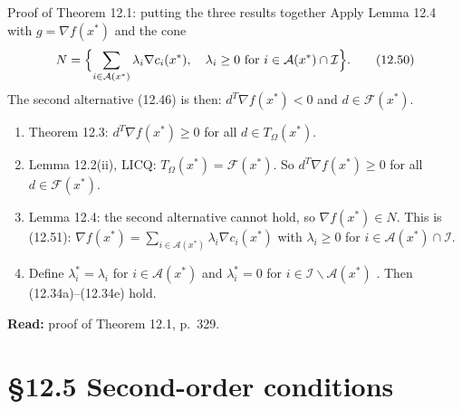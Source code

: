 \documentclass[aspectratio=169,12pt]{beamer}
\newcommand{\xs}{x^{*}}
\newcommand{\gradf}{\nabla f}
\newcommand{\eqn}[1]{\text{\small(#1)}}
\newcommand{\readbook}[1]{{\color{red}\textbf{Read:} #1}}
\newcommand{\ls}{\lambda^{*}}
\newcommand{\cA}{\mathcal{A}}
\newcommand{\cF}{\mathcal{F}}
\newcommand{\cI}{\mathcal{I}}
\newcommand{\TO}{T_{\Omega}}
\begin{document}
\begin{frame}{Proof of Theorem 12.1: putting the three results together}
  Apply Lemma 12.4 with $g=\gradf(\xs)$ and the cone
  \[ N=\Bigl\{\sum_{i\in\cA(\xs)}\lambda_{i}\nabla c_{i}(\xs),\quad
      \lambda_{i}\ge 0\ \text{for } i\in\cA(\xs)\cap\cI\Bigr\} . \tag{12.50} \]
  The second alternative (12.46) is then: $d^{T}\gradf(\xs)<0$ and $d\in\cF(\xs)$.
  \begin{enumerate}\setlength\itemsep{0.1em}
    \item Theorem 12.3: $d^{T}\gradf(\xs)\ge 0$ for all $d\in\TO(\xs)$.
    \item Lemma 12.2(ii), \alert{LICQ}: $\TO(\xs)=\cF(\xs)$. So $d^{T}\gradf(\xs)\ge 0$ for all $d\in\cF(\xs)$.
    \item Lemma 12.4: the second alternative cannot hold, so $\gradf(\xs)\in N$. This is (12.51):
      $\gradf(\xs)=\sum_{i\in\cA(\xs)}\lambda_{i}\nabla c_{i}(\xs)$ with
      $\lambda_{i}\ge 0$ for $i\in\cA(\xs)\cap\cI$.
    \item Define $\ls_{i}=\lambda_{i}$ for $i\in\cA(\xs)$ and $\ls_{i}=0$ for $i\in\cI\backslash\cA(\xs)$
      \eqn{12.52}. Then (12.34a)--(12.34e) hold.
  \end{enumerate}
  \readbook{proof of Theorem 12.1, p.~329.}
\end{frame}

\section{\S12.5 Second-order conditions}
\end{document}
